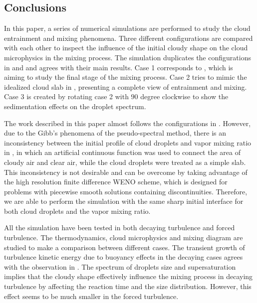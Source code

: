 \documentclass[draft,jgrga]{AGUTeX}
\begin{document}
\begin{article}
\section{Conclusions}\label{conclusion}
In this paper, a series of numerical simulations are performed to study the cloud entrainment and mixing phenomena. Three different configurations are compared with each other to inspect the influence of the initial cloudy shape on the cloud microphysics in the mixing process. The simulation duplicates the configurations in \cite{And04} and \cite{Kumar11} and agrees with their main results. Case 1 corresponds to \cite{And04}, which is aiming to study the final stage of the mixing process. Case 2 tries to mimic the idealized cloud slab in \cite{Kumar11}, presenting a complete view of entrainment and mixing. Case 3 is created by rotating case 2 with $90$ degree clockwise to show the sedimentation effects on the droplet spectrum.

The work described in this paper almost follows the configurations in \cite{Kumar11}. However, due to the Gibb's phenomena of the pseudo-spectral method, there is an inconsistency between the initial profile of cloud droplets and vapor mixing ratio in \cite{Kumar11}, in which an artificial continuous function was used to connect the area of cloudy air and clear air, while the cloud droplets were treated as a simple slab. This inconsistency is not desirable and can be overcome by taking advantage of the high resolution finite difference WENO scheme, which is designed for problems with piecewise smooth solutions containing discontinuities. Therefore, we are able to perform the simulation with the same sharp initial interface for both cloud droplets and the vapor mixing ratio.

All the simulation have been tested in both decaying turbulence and forced turbulence. The thermodynamics, cloud microphysics and mixing diagram are studied to make a comparison between different cases. The transient growth of turbulence kinetic energy due to buoyancy effects in the decaying cases agrees with the observation in \cite{Kumar14}. The spectrum of droplets size and supersaturation implies that the cloudy shape effectively influence the mixing process in decaying turbulence by affecting the reaction time and the size distribution. However, this effect seems to be much smaller in the forced turbulence.


\end{article}
\end{document}
